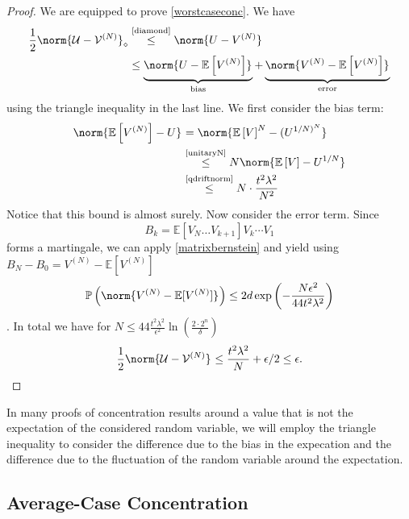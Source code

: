 \begin{proof}
  We are equipped to prove \ref{worstcaseconc}.
  We have 
  \begin{align*}
    \frac{1}{2}{\norm{\mathcal{U}-\mathcal{V}^{(N)}}_{\diamond}} & \overset{\text{\ref{diamond}}}{\leq} \norm{U-V^{(N)}}_{} \\
                                                                 & \leq \underbrace{\norm{U-\mathbb{E}\left[V^{(N)}\right]}_{}}_{\text{bias}} + \underbrace{\norm{V^{(N)}-\mathbb{E}\left[V^{(N)}\right]}_{}}_{\text{error}}
  \end{align*}
  using the triangle inequality in the last line. 
  We first consider the bias term:
  \begin{align*}
    \norm{\mathbb{E}\left[V^{(N)}\right]-U}_{} &= \norm{\mathbb{E}\left[V\right]^{N}-(U^{1/N)^{N}}}_{} \\
                                               & \overset{\text{\ref{unitaryN}}}{\leq} N \norm{\mathbb{E}\left[V\right]-U^{1/N}}_{} \\ 
                                               & \overset{\text{\ref{qdriftnorm}}}{\leq} N \cdot \frac{t^{2}\lambda^{2}}{N^{2}}
  \end{align*}
  Notice that this bound is almost surely. Now consider the error term. Since \[ B_k = \mathbb{E}\left[V_N \dots V_{k+1}\right]V_{k}\cdots V_1 \] 
  forms a martingale, we can apply \ref{matrixbernstein} and yield using \( B_N-B_0= V^{(N)}-\mathbb{E}\left[V^{(N)}\right] \)
  \[ \mathbb{P}\left(\norm{V^{(N)}-\mathbb{E}[V^{(N)}]}_{}\right) \leq 2d \operatorname{exp}\left(-\frac{N \epsilon^{2}}{44 t^{2} \lambda^{2}}\right)\].
In total we have for \( N \leq 44 \frac{t^{2}\lambda^{2}}{\epsilon^{2}} \operatorname{ln}\left(\frac{2\cdot 2^{n}}{\delta}\right) \)
\[ \frac{1}{2} \norm{\mathcal{U}-\mathcal{V}^{(N)}}_{} \leq \frac{t^{2} \lambda^{2}}{N} + \epsilon/2 \leq \epsilon .\]
\end{proof}

In many proofs of concentration results around a value that is not the expectation of the considered random variable, we will employ the triangle inequality to consider the difference due to the bias in the expecation and the difference due to the fluctuation of the random variable around the expectation.


\subsection{Average-Case Concentration}

